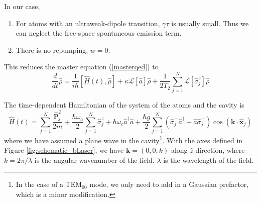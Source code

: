 \documentclass{article}
\newcommand{\omegaa}{\omega_a}
\newcommand{\omegac}{\omega_c}
\newcommand{\lindblad}{\mathcal{L}}
\begin{document}
\bigskip
In our case,
\begin{enumerate}
    \item For atoms with an ultraweak-dipole transition, $\gamma \tau$ is usually small. Thus we can neglect the free-space spontaneous emission term.
    \item There is no repumping, $w=0$.
\end{enumerate} 

This reduces the master equation (\ref{masterqed}) to
\begin{equation}
\label{master}
\frac{d}{dt}\hat{\rho}=\frac{1}{i\hbar}\left[\hat{H}(t),\hat{\rho}\right]+\kappa\lindblad[\hat{a}]\hat{\rho}+\frac{1}{2T_2}\sum^{N}_{j=1}\lindblad[\hat{\sigma}^z_j]\hat{\rho}
\end{equation}


The time-dependent Hamiltonian of the system of the atoms and the cavity is 
\begin{equation}
\label{hamil}
\hat{H}(t)=\sum^{N}_{j=1}\frac{\hat{\textbf{p}}_j^2}{2m}+\frac{\hbar\omegaa}{2}\sum^{N}_{j=1}\hat{\sigma}^z_j+\hbar \omegac \hat{a}^{\dagger}\hat{a}+\frac{\hbar g}{2}\sum^{N}_{j=1}\left(\hat{\sigma}^-_j\hat{a}^\dagger+\hat{a}\hat{\sigma}^+_j\right)\cos\left(\textbf{k}\cdot\hat{\textbf{x}}_j\right)
\end{equation}
where we have assumed a plane wave in the cavity\footnote{In the case of a TEM$_{00}$ mode, we only need to add in a Gaussian prefactor, which is a minor modification.}. With the axes defined in Figure \ref{fig:schematic_bLaser}, we have $\textbf{k} = (0, 0, k)$ along $\hat{z}$ direction, where $k = 2\pi/\lambda$ is the angular wavenumber of the field. $\lambda$ is the wavelength of the field.
\end{document}

